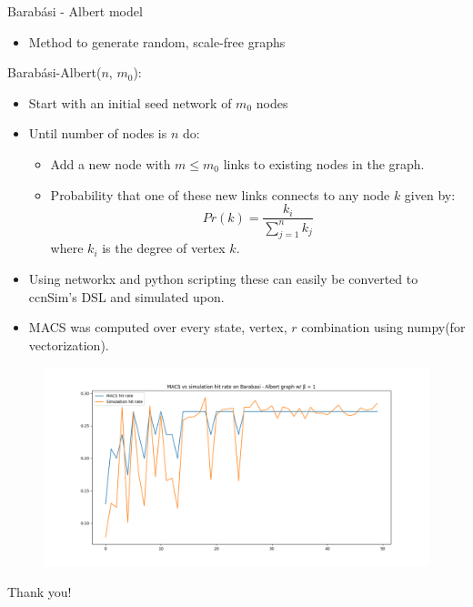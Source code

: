 \documentclass[
	xcolor={svgnames},
	hyperref={pagebackref,bookmarks},
	aspectratio=43,
]{beamer}
\begin{document}
\begin{frame}{Barabási - Albert model\footnotemark}
    \begin{itemize}
        \item Method to generate random, scale-free graphs 
    \end{itemize}
    \begin{block}{Barabási-Albert($n$, $m_0$):}
        \begin{itemize}
            \item Start with an initial seed network of $m_0$ nodes
            \item Until number of nodes is $n$ do:
            \begin{itemize}
                \item Add a new node with $m \leq m_0$ links to existing nodes in the graph. 
                \item Probability that one of these new links connects to any node $k$ given by:
                \begin{equation*}
                    Pr(k) = \frac{k_i}{\sum_{j=1}^n k_j}
                \end{equation*}
                where $k_i$ is the degree of vertex $k$.
            \end{itemize}
        \end{itemize}
    \end{block}
\end{frame}

\begin{frame}{}
    \begin{itemize}
        \item Using networkx and python scripting these can easily be converted to ccnSim's DSL and simulated upon. 
        \item MACS was computed over every state, vertex, $r$ combination using numpy(for vectorization).
    \end{itemize}
    \begin{figure}
        \centering
        \includegraphics[scale=0.3]{ba_result.png}
    \end{figure}
\end{frame}

\begin{frame}
	\begin{center}
		\huge Thank you!
	\end{center}
\end{frame}
\end{document}
